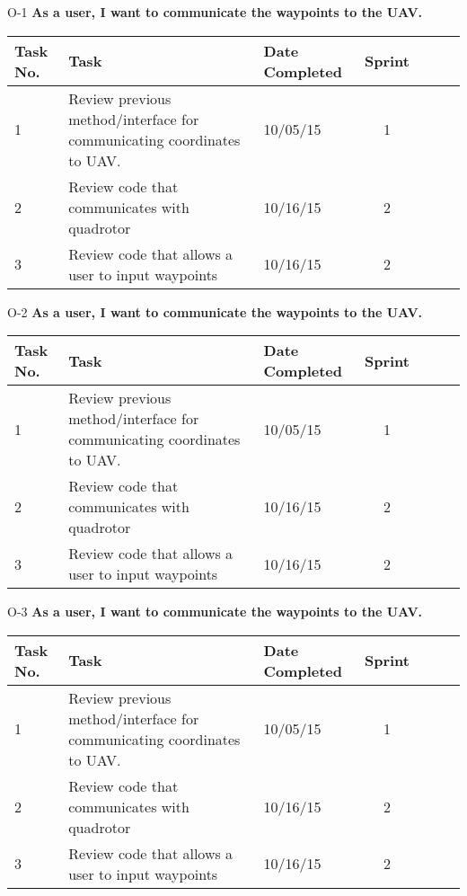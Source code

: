 \documentclass[11pt]{beamer}
\begin{document}
\begin{frame}{O-1}
\textbf{As a user, I want to communicate the waypoints to the UAV.}
\begin{tabular}{| p{1cm} | lp{2cm} | cp{2cm} | cp{1cm} |}\hline
Task No. & Task & Date Completed & Sprint\\\hline
1 & Review previous method/interface for communicating coordinates to UAV. & 10/05/15 & 1 \\\hline
2 & Review code that communicates with quadrotor & 10/16/15 & 2 \\\hline
3 & Review code that allows a user to input waypoints & 10/16/15 & 2\\\hline

\end{tabular}
\end{frame}


\begin{frame}{O-2}
\textbf{As a user, I want to communicate the waypoints to the UAV.}
\begin{tabular}{| p{1cm} | lp{2cm} | cp{2cm} | cp{1cm} |}\hline
Task No. & Task & Date Completed & Sprint\\\hline
1 & Review previous method/interface for communicating coordinates to UAV. & 10/05/15 & 1 \\\hline
2 & Review code that communicates with quadrotor & 10/16/15 & 2 \\\hline
3 & Review code that allows a user to input waypoints & 10/16/15 & 2\\\hline

\end{tabular}
\end{frame}


\begin{frame}{O-3}
\textbf{As a user, I want to communicate the waypoints to the UAV.}
\begin{tabular}{| p{1cm} | lp{2cm} | cp{2cm} | cp{1cm} |}\hline
Task No. & Task & Date Completed & Sprint\\\hline
1 & Review previous method/interface for communicating coordinates to UAV. & 10/05/15 & 1 \\\hline
2 & Review code that communicates with quadrotor & 10/16/15 & 2 \\\hline
3 & Review code that allows a user to input waypoints & 10/16/15 & 2\\\hline

\end{tabular}
\end{frame}
\end{document}
